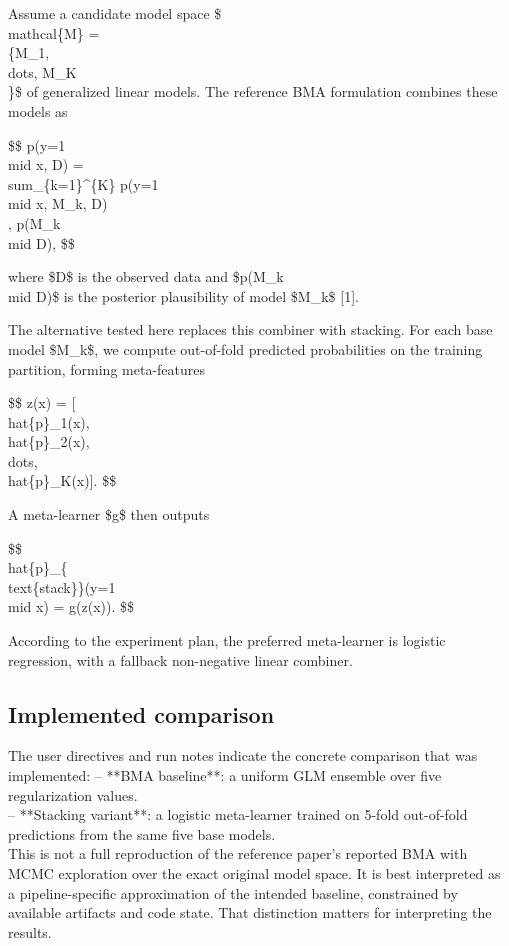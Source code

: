 \documentclass[11pt,a4paper]{article}
\begin{document}
Assume a candidate model space \$\\mathcal\{M\} = \\\{M\_1, \\dots, M\_K\\\}\$ of generalized linear models. The reference BMA formulation combines these models as

\$\$
p(y=1 \\mid x, D) = \\sum\_\{k=1\}\textasciicircum{}\{K\} p(y=1 \\mid x, M\_k, D)\\, p(M\_k \\mid D),
\$\$

where \$D\$ is the observed data and \$p(M\_k \\mid D)\$ is the posterior plausibility of model \$M\_k\$ [1].

The alternative tested here replaces this combiner with stacking. For each base model \$M\_k\$, we compute out-of-fold predicted probabilities on the training partition, forming meta-features

\$\$
z(x) = [\\hat\{p\}\_1(x), \\hat\{p\}\_2(x), \\dots, \\hat\{p\}\_K(x)].
\$\$

A meta-learner \$g\$ then outputs

\$\$
\\hat\{p\}\_\{\\text\{stack\}\}(y=1 \\mid x) = g(z(x)).
\$\$

According to the experiment plan, the preferred meta-learner is logistic regression, with a fallback non-negative linear combiner.


\subsection{Implemented comparison}
The user directives and run notes indicate the concrete comparison that was implemented:
\noindent -- **BMA baseline**: a uniform GLM ensemble over five regularization values.\\
\noindent -- **Stacking variant**: a logistic meta-learner trained on 5-fold out-of-fold predictions from the same five base models.\\

This is not a full reproduction of the reference paper’s reported BMA with MCMC exploration over the exact original model space. It is best interpreted as a pipeline-specific approximation of the intended baseline, constrained by available artifacts and code state. That distinction matters for interpreting the results.
\end{document}
